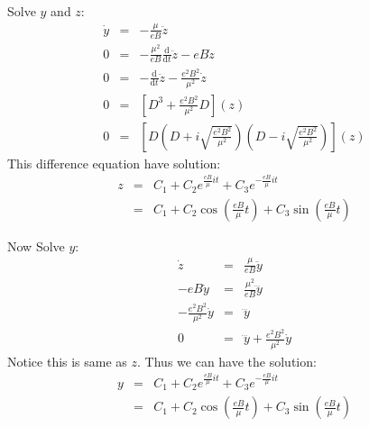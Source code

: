 \documentclass{article}
\newcommand{\de}{\mathrm{d}}
\begin{document}
\begin{enumerate}
\begin{enumerate}
        Solve $y$ and $z$:
        \begin{eqnarray*}
        \dot{y} &=& -\frac{\mu}{eB}\ddot{z}\\
        0 &=& -\frac{\mu^2}{eB} \frac{\de}{\de t} \ddot{z} - eB\dot{z} \\
        0 &=& -\frac{\de}{\de t} \ddot{z} - \frac{e^2B^2}{\mu^2}\dot{z} \\
        0 &=& [D^3 + \frac{e^2B^2}{\mu^2} D](z) \\
        0 &=& [D(D+i\sqrt{\frac{e^2B^2}{\mu^2}})(D-i\sqrt{\frac{e^2B^2}{\mu^2}})](z)
        \end{eqnarray*}
        This difference equation have solution:
        \begin{eqnarray*}
        z &=& C_1 + C_2e^{\frac{eB}{\mu}it}+C_3 e^{-\frac{eB}{\mu}it}\\
        &=& C_1 + C_2\cos(\frac{eB}{\mu}t)+ C_3\sin(\frac{eB}{\mu}t)
        \end{eqnarray*}

        Now Solve $y$:
        \begin{eqnarray*}
        \dot{z} &=&\frac{\mu}{eB}\ddot{y}\\
        -eB\dot{y} &=&  \frac{\mu^2}{eB}\dddot{y} \\
        -\frac{e^2B^2}{\mu^2}\dot{y} &=&  \dddot{y}\\
        0 &=& \dddot{y} + \frac{e^2B^2}{\mu^2}\dot{y}
        \end{eqnarray*}
        Notice this is same as $z$. Thus we can have the solution:
        \begin{eqnarray*}
        y &=& C_1 + C_2e^{\frac{eB}{\mu}it}+C_3 e^{-\frac{eB}{\mu}it}\\
        &=& C_1 + C_2\cos(\frac{eB}{\mu}t)+ C_3\sin(\frac{eB}{\mu}t)
        \end{eqnarray*}


\end{enumerate}
\end{enumerate}
\end{document}
